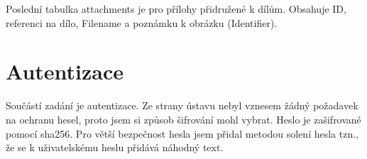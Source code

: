         Poslední tabulka attachments je pro přílohy přidružené k dílům. Obsahuje ID, referenci na dílo, Filename a poznámku k obrázku (Identifier).
        
    \section{Autentizace} \label{autentizace}
        Součástí zadání je autentizace. Ze strany ústavu nebyl vznesem žádný požadavek na ochranu hesel, proto jsem si způsob šifrování mohl vybrat. Heslo je zašifrované pomocí sha256. Pro větší bezpečnost hesla jsem přidal metodou solení hesla tzn., že se k uživatelskému heslu přidává náhodný text.
        
